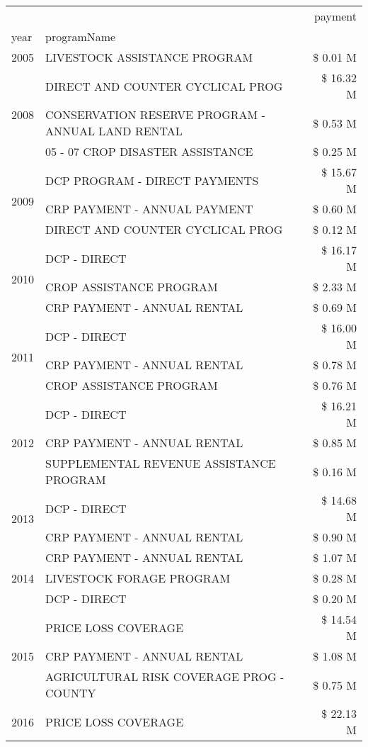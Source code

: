 \begin{tabular}{llr}
\toprule
 &  & payment \\
year & programName &  \\
\midrule
2005 & LIVESTOCK ASSISTANCE PROGRAM & \$ 0.01 M \\
\cline{1-3}
\multirow[t]{3}{*}{2008} & DIRECT AND COUNTER CYCLICAL PROG & \$ 16.32 M \\
 & CONSERVATION RESERVE PROGRAM - ANNUAL LAND RENTAL & \$ 0.53 M \\
 & 05 - 07 CROP DISASTER ASSISTANCE & \$ 0.25 M \\
\cline{1-3}
\multirow[t]{3}{*}{2009} & DCP PROGRAM - DIRECT PAYMENTS & \$ 15.67 M \\
 & CRP PAYMENT - ANNUAL PAYMENT & \$ 0.60 M \\
 & DIRECT AND COUNTER CYCLICAL PROG & \$ 0.12 M \\
\cline{1-3}
\multirow[t]{3}{*}{2010} & DCP - DIRECT & \$ 16.17 M \\
 & CROP ASSISTANCE PROGRAM & \$ 2.33 M \\
 & CRP PAYMENT - ANNUAL RENTAL & \$ 0.69 M \\
\cline{1-3}
\multirow[t]{3}{*}{2011} & DCP - DIRECT & \$ 16.00 M \\
 & CRP PAYMENT - ANNUAL RENTAL & \$ 0.78 M \\
 & CROP ASSISTANCE PROGRAM & \$ 0.76 M \\
\cline{1-3}
\multirow[t]{3}{*}{2012} & DCP - DIRECT & \$ 16.21 M \\
 & CRP PAYMENT - ANNUAL RENTAL & \$ 0.85 M \\
 & SUPPLEMENTAL REVENUE ASSISTANCE PROGRAM & \$ 0.16 M \\
\cline{1-3}
\multirow[t]{2}{*}{2013} & DCP - DIRECT & \$ 14.68 M \\
 & CRP PAYMENT - ANNUAL RENTAL & \$ 0.90 M \\
\cline{1-3}
\multirow[t]{3}{*}{2014} & CRP PAYMENT - ANNUAL RENTAL & \$ 1.07 M \\
 & LIVESTOCK FORAGE PROGRAM & \$ 0.28 M \\
 & DCP - DIRECT & \$ 0.20 M \\
\cline{1-3}
\multirow[t]{3}{*}{2015} & PRICE LOSS COVERAGE & \$ 14.54 M \\
 & CRP PAYMENT - ANNUAL RENTAL & \$ 1.08 M \\
 & AGRICULTURAL RISK COVERAGE PROG - COUNTY & \$ 0.75 M \\
\cline{1-3}
\multirow[t]{3}{*}{2016} & PRICE LOSS COVERAGE & \$ 22.13 M \\

\end{tabular}
